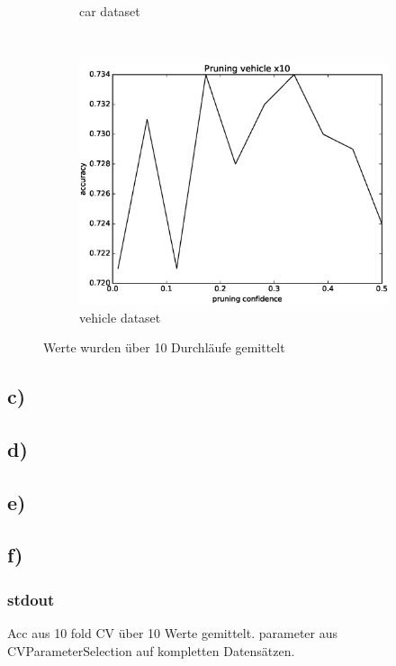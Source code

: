 \documentclass[a4paper,11pt,twoside]{article}
\begin{document}
\begin{figure}[h]
\begin{subfigure}[t]{0.33\textwidth}
		\caption{car dataset}
	\end{subfigure}%
	~
	\begin{subfigure}[t]{0.33\textwidth}
		\includegraphics[width=\textwidth]{img/vehicle}
		\caption{vehicle dataset}
	\end{subfigure}
	\caption{Werte wurden über 10 Durchläufe gemittelt}
\end{figure}
\lstset{language=java}
\subsection*{c)}

\subsection*{d)}

\subsection*{e)}

\subsection*{f)}




\subsubsection*{stdout}
Acc aus 10 fold CV über 10 Werte gemittelt. parameter aus CVParameterSelection auf kompletten Datensätzen.\\

\end{document}
